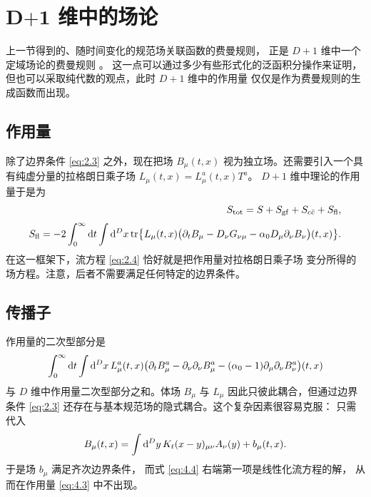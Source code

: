 \section{$\boldsymbol{D}\mathbf{+1}$ 维中的场论}\label{sec:fieldtheory}

上一节得到的、随时间变化的规范场关联函数的费曼规则，
正是 $D+1$ 维中一个定域场论的费曼规则 \cite{ZinnZwanziger}。
这一点可以通过多少有些形式化的泛函积分操作来证明，
但也可以采取纯代数的观点，此时 $D+1$ 维中的作用量
仅仅是作为费曼规则的生成函数而出现。

\subsection{作用量}

除了边界条件 \eqref{eq:2.3} 之外，现在把场 $B_{\mu}(t,x)$
视为独立场。还需要引入一个具有纯虚分量的拉格朗日乘子场
$L_{\mu}(t,x)=L_{\mu}^a(t,x)T^a$。
$D+1$ 维中理论的作用量于是为 \cite{ZinnZwanziger}
\begin{align}
   S_{\mathrm{tot}}=S+S_{\mathrm{gf}}+S_{c\bar{c}}+S_{\mathrm{fl}},
   \label{eq:4.1}\\[2.5pt]
   S_{\mathrm{fl}}=-2\int_0^{\infty}\mathrm{d} t\int\mathrm{d}^Dx\,
   \mathrm{tr}\bigl\{L_{\mu}(t,x)
   \bigl(\partial_tB_{\mu}-
         D_{\nu}G_{\nu\mu}-\alpha_0D_{\mu}\partial_{\nu}B_{\nu}
   \bigr)(t,x)\bigr\}.
   \label{eq:4.2}
\end{align}
在这一框架下，流方程 \eqref{eq:2.4} 恰好就是把作用量对拉格朗日乘子场
变分所得的场方程。注意，后者不需要满足任何特定的边界条件。

\subsection{传播子}\label{ssec:propagators4}

作用量的二次型部分是
\begin{equation}
   \int_0^{\infty}\mathrm{d} t\int\mathrm{d}^Dx\, L^a_{\mu}(t,x)
   \bigl(
   \partial_tB^a_{\mu}-\partial_{\nu}\partial_{\nu}B^a_{\mu}
   -(\alpha_0-1)\partial_{\mu}\partial_{\nu}B^a_{\nu}
   \bigr)(t,x)
   \label{eq:4.3}
\end{equation}
与 $D$ 维中作用量二次型部分之和。体场 $B_{\mu}$ 与 $L_{\mu}$
因此只彼此耦合，但通过边界条件 \eqref{eq:2.3}
还存在与基本规范场的隐式耦合。这个复杂因素很容易克服：
只需代入
\begin{equation}
   B_{\mu}(t,x)=\int\mathrm{d}^Dy\,K_t(x-y)_{\mu\nu}A_{\nu}(y)+b_{\mu}(t,x).
   \label{eq:4.4}
\end{equation}
于是场 $b_{\mu}$ 满足齐次边界条件，
而式 \eqref{eq:4.4} 右端第一项是线性化流方程的解，
从而在作用量 \eqref{eq:4.3} 中不出现。

